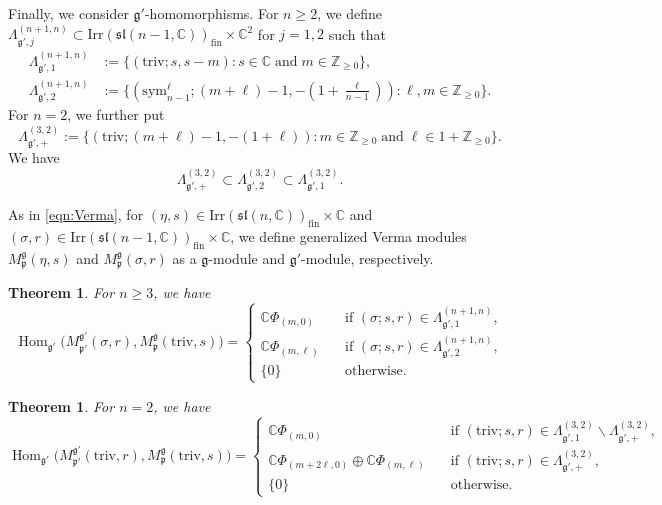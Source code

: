 \documentclass[reqno,11pt]{amsart}
\newtheorem{thm}[equation]{Theorem}
\theoremstyle{remark}
\theoremstyle{definition}
\numberwithin{equation}{section}
\newcommand{\gL}{\Lambda}
\newcommand{\fg}{{\mathfrak g}}
\newcommand{\fp}{{\mathfrak p}}
\newcommand{\f}{\mathfrak}
\newcommand{\C}{\mathbb{C}}
\newcommand{\Z}{\mathbb{Z}}
\newcommand{\Hom}{\operatorname{Hom}}
\newcommand{\Irr}{\mathrm{Irr}}
\newcommand{\triv}{\mathrm{triv}}
\newcommand{\fin}{\mathrm{fin}}
\newcommand{\sym}{\mathrm{sym}}
\newcommand{\Mp}{M^{\fg}_{\fp}}
\newcommand{\Mpp}{M^{\fg'}_{\fp'}}
\begin{document}
Finally, we consider $\fg'$-homomorphisms.
For $n\geq 2$,  we define $\gL^{(n+1,n)}_{\fg',j} \subset 
\Irr(\f{sl}(n-1,\C))_{\fin} \times \C^2$ for  $j=1,2$ such that
\begin{align*}
\gL^{(n+1,n)}_{\fg',1}&:=\{
(\triv; s,  s-m) :  s\in \C\; \text{and} \; m\in \Z_{\geq 0}\},\\
\gL^{(n+1,n)}_{\fg',2}&:=\{
(\sym_{n-1}^\ell; (m+\ell)-1,  -(1+\tfrac{\ell}{n-1})) : \ell, m\in \Z_{\geq 0}\}.
\end{align*}
For $n=2$, we further put
\begin{equation*}
\Lambda^{(3,2)}_{\fg',+}
:=\{(\triv; (m+\ell)-1,  -(1+\ell)) : m\in \Z_{\geq 0}\; \text{and}\; 
\ell \in 1+\Z_{\geq 0}\}.
\end{equation*}
We have
\begin{equation*}
\Lambda^{(3,2)}_{\fg',+}  \subset \Lambda^{(3,2)}_{\fg',2} \subset \gL^{(3,2)}_{\fg',1}.
\end{equation*}

As in \eqref{eqn:Verma},
for $(\eta, s) \in \Irr(\f{sl}(n,\C))_\fin\times \C$ and 
$(\sigma,r) \in \Irr(\f{sl}(n-1,\C))_\fin\times \C$,
we define generalized Verma modules $\Mp(\eta,s)$ and  $\Mp(\sigma,r)$
as a $\fg$-module and $\fg'$-module, respectively.


\begin{thm}\label{thm:Hom3a}
For $n\geq 3$, we have
\begin{equation*}
\Hom_{\fg'}\big(\Mpp(\sigma,r), \Mp(\triv, s)\big)
=
\begin{cases}
\C\Phi_{(m,0)} \quad &\text{if $(\sigma;s,r)\in \gL^{(n+1,n)}_{\fg',1}$},\\[3pt]
\C\Phi_{(m,\ell)} \quad &\text{if $(\sigma;s,r)\in \gL^{(n+1,n)}_{\fg',2}$},\\
\{0\} \quad &\text{otherwise}.
\end{cases}
\end{equation*}
\end{thm}


\begin{thm}\label{thm:Hom3b}
For $n = 2$, we have
\begin{equation*}
\Hom_{\fg'}\big(\Mpp(\triv,r), \Mp(\triv, s)\big)
=
\begin{cases}
\C\Phi_{(m,0)} \quad 
&\text{if $(\triv;s,r)\in \gL^{(3,2)}_{\fg',1}\backslash  \gL^{(3,2)}_{\fg',+}$},\\[3pt]
\C\Phi_{(m+2\ell,0)}\oplus \C\Phi_{(m,\ell)} \quad &\text{if $(\triv;s,r)\in \gL^{(3,2)}_{\fg',+}$},\\
\{0\} \quad &\text{otherwise}.
\end{cases}
\end{equation*}
\end{thm}
\end{document}
